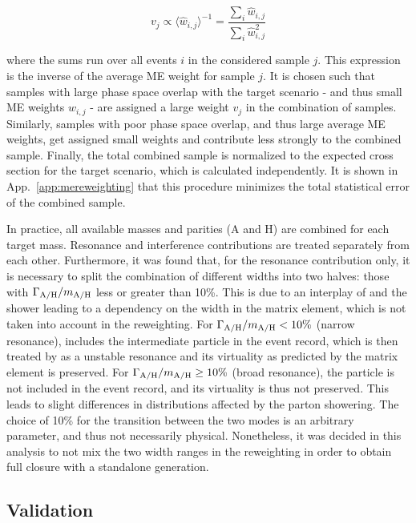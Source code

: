 \begin{equation}
\label{eq:ah:sampleweights}
    v_j \propto {\langle \hat{w}_{i,j} \rangle}^{-1} =  \frac{ \sum_i \hat{w}_{i,j} }{ \sum_i \hat{w}_{i,j}^2 }
\end{equation}

\noindent where the sums run over all events $i$ in the considered sample $j$. This expression is the inverse of the average ME weight for sample $j$. It is chosen such that samples with large phase space overlap with the target \AH scenario - and thus small ME weights $w_{i,j}$ - are assigned a large weight $v_j$ in the combination of samples. Similarly, samples with poor phase space overlap, and thus large average ME weights, get assigned small weights and contribute less strongly to the combined sample. Finally, the total combined sample is normalized to the expected cross section for the target scenario, which is calculated independently. It is shown in App.~\ref{app:mereweighting} that this procedure minimizes the total statistical error of the combined sample.

In practice, all available masses and parities (A and H) are combined for each target \AH mass. Resonance and interference contributions are treated separately from each other. Furthermore, it was found that, for the resonance contribution only, it is necessary to split the combination of different \AH widths into two halves: those with $\Gamma_{\mathrm{A/H}}/m_{\mathrm{A/H}}$ less or greater than 10\%. This is due to an interplay of \madgraph and the \pythia shower leading to a dependency on the \AH width in the matrix element, which is not taken into account in the reweighting. For $\Gamma_{\mathrm{A/H}}/m_{\mathrm{A/H}} < 10\%$ (narrow resonance), \madgraph includes the intermediate \AH particle in the event record, which is then treated by \pythia as a unstable resonance and its virtuality as predicted by the matrix element is preserved. For $\Gamma_{\mathrm{A/H}}/m_{\mathrm{A/H}} \geq 10\%$ (broad resonance), the \AH particle is not included in the event record, and its virtuality is thus not preserved. This leads to slight differences in distributions affected by the parton showering. The choice of 10\% for the transition between the two modes is an arbitrary parameter, and thus not necessarily physical. Nonetheless, it was decided in this analysis to not mix the two width ranges in the reweighting in order to obtain full closure with a standalone generation.

\subsection{Validation}

